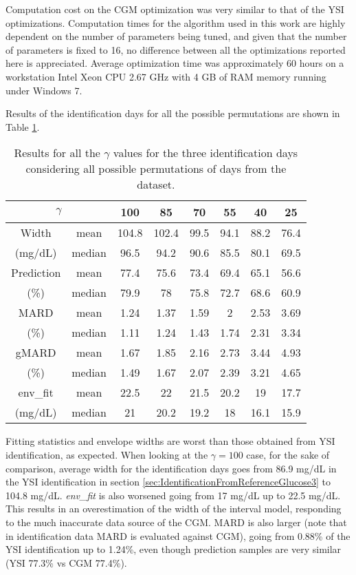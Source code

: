 Computation cost on the CGM optimization was very similar to that of the YSI optimizations. Computation times for the algorithm used in this work are highly dependent on the number of parameters being tuned, and given that the number of parameters is fixed to 16, no difference between all the optimizations reported here is appreciated. Average optimization time was approximately 60 hours on a workstation Intel \textregistered Xeon \textregistered CPU 2.67 GHz with 4 GB of RAM memory running under Windows 7.

Results of the identification days for all the possible permutations are shown in Table \ref{tab:resultsCGMident}.

\begin{table}[hbtp]
	\centering
	\begin{tabular}{| c | c | c | c | c | c | c | c |} 
	\hline
	\multicolumn{2}{|c|}{$\gamma$} & 100 & 85 & 70 & 55 & 40 & 25 \\											
	\hline
	Width & mean &	104.8 & 102.4 & 99.5 & 94.1 & 88.2 & 76.4 \\
	(mg/dL) & median & 96.5 & 94.2 & 90.6 & 85.5 & 80.1 & 69.5 \\
	\hline
	Prediction & mean & 77.4 & 75.6 & 73.4 & 69.4 & 65.1 & 56.6 \\
	(\%) & median & 79.9 & 78 & 75.8 & 72.7 & 68.6 & 60.9 \\
	\hline
	MARD & mean & 1.24 & 1.37 & 1.59	& 2 & 2.53 & 3.69 \\
	(\%) & median & 1.11 & 1.24 & 1.43 & 1.74 & 2.31 & 3.34 \\
	\hline
	gMARD & mean & 1.67 & 1.85 & 2.16 & 2.73 & 3.44 & 4.93 \\
	(\%) & median & 1.49 & 1.67 & 2.07 & 2.39 & 3.21 & 4.65 \\
	\hline
	env\_fit & mean & 22.5 & 22 & 21.5 & 20.2 & 19 & 17.7 \\
	(mg/dL) & median & 21 & 20.2 & 19.2 & 18 & 16.1 & 15.9 \\
	\hline
\end{tabular}
\caption{Results for all the $\gamma$ values for the three identification days considering all possible permutations of days from the dataset.}
\label{tab:resultsCGMident}
\end{table}

Fitting statistics and envelope widths are worst than those obtained from YSI identification, as expected. When looking at the $\gamma=100$ case, for the sake of comparison, average width for the identification days goes from 86.9 mg/dL in the YSI identification in section \ref{sec:IdentificationFromReferenceGlucose3} to 104.8 mg/dL. \textit{env\_fit} is also worsened going from 17 mg/dL up to 22.5 mg/dL. This results in an overestimation of the width of the interval model, responding to the much inaccurate data source of the CGM. MARD is also larger (note that in identification data MARD is evaluated against CGM), going from 0.88\% of the YSI identification up to 1.24\%, even though prediction samples are very similar (YSI 77.3\% vs CGM 77.4\%).

